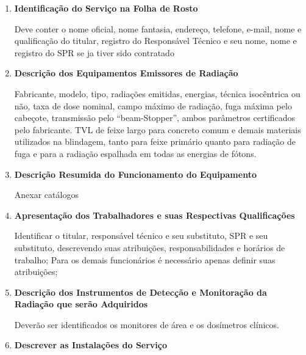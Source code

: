 \documentclass[11pt,a4paper]{article}
\begin{document}
            \begin{enumerate}
                \item \textbf{\textcolor{CarnationPink}{Identificação do Serviço na Folha de Rosto}}
                
                    Deve conter o nome oficial, nome fantasia, endereço, telefone, e-mail, nome e qualificação do titular, registro do Responsável Técnico e seu nome, nome e registro do SPR se ja tiver sido contratado

                \item \textbf{\textcolor{CarnationPink}{Descrição dos Equipamentos Emissores de Radiação}}

                    Fabricante, modelo, tipo, radiações emitidas, energias, técnica isocêntrica ou não, taxa de dose nominal, campo máximo de radiação, fuga máxima pelo cabeçote, transmissão pelo ``beam-Stopper'', ambos parâmetros certificados pelo fabricante. TVL de feixe largo para concreto comum e demais materiais utilizados na blindagem, tanto para feixe primário quanto para radiação de fuga e para a radiação espalhada em todas as energias de fótons.

                \item \textbf{\textcolor{CarnationPink}{Descrição Resumida do Funcionamento do Equipamento}}
                
                    Anexar catálogos 
                
                \item \textbf{\textcolor{CarnationPink}{Apresentação dos Trabalhadores e suas Respectivas Qualificações}}
                
                    Identificar o titular, responsável técnico e seu substituto, SPR e seu substituto, descrevendo suas atribuições, responsabilidades e horários de trabalho; Para os demais funcionários é necessário apenas definir suas atribuições;
                
                \item \textbf{\textcolor{CarnationPink}{Descrição dos Instrumentos de Detecção e Monitoração da Radiação que serão Adquiridos}}
                
                    Deverão ser identificados os monitores de área e os dosímetros clínicos.

                \item \textbf{\textcolor{CarnationPink}{Descrever as Instalações do Serviço}}
                

\end{enumerate}
\end{document}
